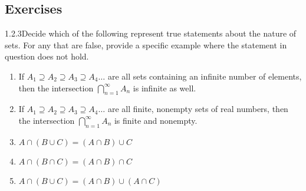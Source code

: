 
\subsection*{Exercises}

\begin{exercise}
    {1.2.3}Decide which of the following represent true statements about
the nature of sets. For any that are false, provide a specific example where the
statement in question does not hold.
\begin{enumerate}
    \item If $A_1 \supseteq A_2 \supseteq A_3 \supseteq A_4\dots$ are all sets containing an infinite number of
elements, then the intersection $\bigcap^\infty_{n=1} A_n$ is infinite as well.
    \item If $A_1 \supseteq A_2 \supseteq A_3 \supseteq A_4\dots$ are all finite, nonempty sets of real numbers,
then the intersection $\bigcap^\infty_{n=1} A_n$ is finite and nonempty.
    \item $A \cap (B \cup C) = (A \cap B) \cup C$
    \item $A \cap (B \cap C) = (A \cap B) \cap C$
    \item $A \cap (B \cup C) = (A \cap B) \cup (A \cap C)$
\end{enumerate}
\end{exercise}

